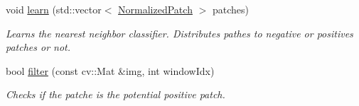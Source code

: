 \begin{DoxyCompactItemize}
void \hyperlink{classtld_1_1NNClassifier_aa6a34e43628807018da166897063ea02}{learn} (std\-::vector$<$ \hyperlink{classtld_1_1NormalizedPatch}{Normalized\-Patch} $>$ patches)
\begin{DoxyCompactList}\small\item\em Learns the nearest neighbor classifier. Distributes pathes to negative or positives patches or not. \end{DoxyCompactList}\item 
bool \hyperlink{classtld_1_1NNClassifier_a173e8f32e073d88c93203ff6ec3352ab}{filter} (const cv\-::\-Mat \&img, int window\-Idx)
\begin{DoxyCompactList}\small\item\em Checks if the patche is the potential positive patch. \end{DoxyCompactList}\end{DoxyCompactItemize}
